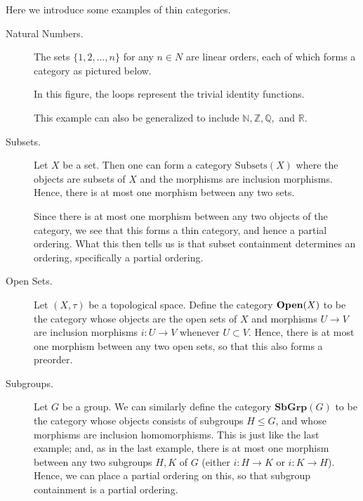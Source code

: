     \begin{example}
        Here we introduce some examples of thin categories.
        \begin{description}
            \item[Natural Numbers.] 
            The sets $\{1, 2, \dots, n\}$ for any $n \in N$ are
            linear orders, each of which forms a category as pictured below.
            \begin{center}
            \end{center}
            In this figure, the loops represent the trivial identity functions.

            This example can also be generalized to include $\mathbb{N}, \mathbb{Z}, 
            \mathbb{Q},$ and $\mathbb{R}$. 

            \item[Subsets.] 
            Let $X$ be a set. Then one can form a category $\text{Subsets}(X)$ where the 
            objects are subsets of $X$ and the morphisms are inclusion morphisms. Hence,
            there is at most one morphism between any two sets.

            Since there is at most one morphism between any two objects of the 
            category, we see that this forms a thin category, and hence a partial ordering. 
            What this then tells us is that subset containment determines an ordering, 
            specifically a partial ordering. 

            \item[Open Sets.]   
            Let $(X, \tau)$ be a topological space. Define the category 
            $\operatorname{\mathbf{Open}}(X)$ to be the category whose objects are the open sets of $X$ 
            and morphisms $U \to V$ are inclusion morphisms $i: U \to V$ whenever $U \subset V$.
            Hence, there is at most one morphism between any two open sets, so that this 
            also forms a preorder.
            
            \item[Subgroups.] 
            Let $G$ be a group. We can similarly define the category 
            $\textbf{SbGrp}(G)$ to be the category whose objects consists 
            of subgroups $H \le G$, and whose morphisms are inclusion homomorphisms.
            This is just like the last example; and, as in the last example, 
            there is at most one morphism between any two subgroups $H, K$ of $G$ 
            (either $i: H \to K$ or $i: K \to H$). Hence, we can place a partial ordering 
            on this, so that subgroup containment is a partial ordering.


\end{description}
\end{example}
